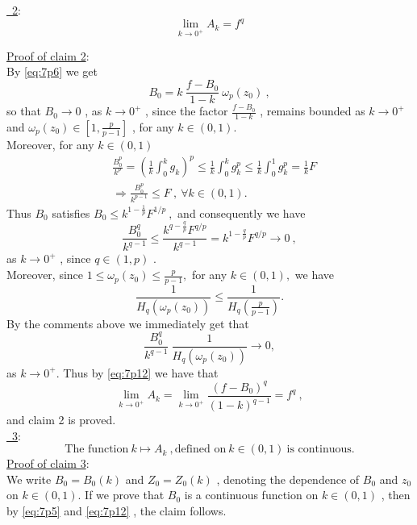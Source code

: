 \documentclass{article}
\numberwithin{equation}{section}
\theoremstyle{definition}
\theoremstyle{remark}
\begin{document}
\noindent \underline{ \ 2}:
\[  
    \lim \limits_{k \to 0^+} A_k = f^q
\]

\noindent \underline{Proof of claim 2}: \\

\noindent By \eqref{eq:7p6} we get
\[
B_0 = k \ \frac{f-B_0}{1-k} \ \omega_p(z_0) \ ,
\]
so that $B_0 \to 0$ , as $k \to 0^+$ , since the factor $\frac{f-B_0}{1-k}$ , remains bounded as $k \to 0^+$ and $\omega_p(z_0) \in \left [ 1 , \frac{p}{p-1} \right ]$ , for any $k \in (0,1)$. \\

\noindent Moreover, for any $k \in (0,1)$
\begin{align*}
&\frac{B_0^p}{k^p} = \left ( \frac{1}{k} \int_0^k g_k \right )^p \leq \frac{1}{k} \int_0^k g_k^p \leq  \frac{1}{k}\int_0^1 g_k^p = \frac{1}{k} F \\
&\Rightarrow \frac{B_0^p}{k^{p-1}} \leq F \ , \ \forall k \in (0,1).
\end{align*}
%
Thus $B_0$ satisfies $B_0 \leq k^{1-\frac{1}{p}} F^{1/p} \ ,$ and consequently we have
\[
\frac{B_0^q}{k^{q-1}} \leq \frac{k^{q-\frac{q}{p}} F^{q/p}}{k^{q-1}} = k^{1-\frac{q}{p}} F^{q/p} \to 0 \ ,
\]
%
as $k \to 0^+$ , since $q \in (1, p)$ . \\

\noindent Moreover, since $1 \leq \omega_p (z_0) \leq \frac{p}{p-1} ,$ for any $k \in (0,1) ,$ we have
\[
\frac{1}{H_q(\omega_p(z_0))} \leq \frac{1}{H_q \left ( \frac{p}{p-1} \right )} .
\]
%
By the comments above we immediately get that $$\frac{B_0^q}{k^{q-1}} \ \frac{1}{H_q(\omega_p(z_0))} \to 0 ,$$ 
as $k \to 0^+ .$ Thus by \eqref{eq:7p12} we have that
\[
\lim \limits_{k \to 0^+} A_k = \lim \limits_{k \to 0^+} \frac{(f-B_0)^q}{(1-k)^{q-1}} = f^q \ ,
\]
%
and claim 2 is proved. \\

\noindent \underline{ \ 3}:
\[
\text{The function} \ k \mapsto A_k \ , \text{defined on} \ k \in (0,1) \ \text{is continuous}.
\]
%
\noindent \underline{Proof of claim 3}: \\

\noindent We write $B_0 = B_0(k)$ and $Z_0 = Z_0(k)$ , denoting the dependence of $B_0$ and $z_0$ on $k \in (0,1)$. If we prove that $B_0$ is a continuous function on $k \in (0,1)$ , then by \eqref{eq:7p5} and \eqref{eq:7p12} , the claim follows. \\
\end{document}
